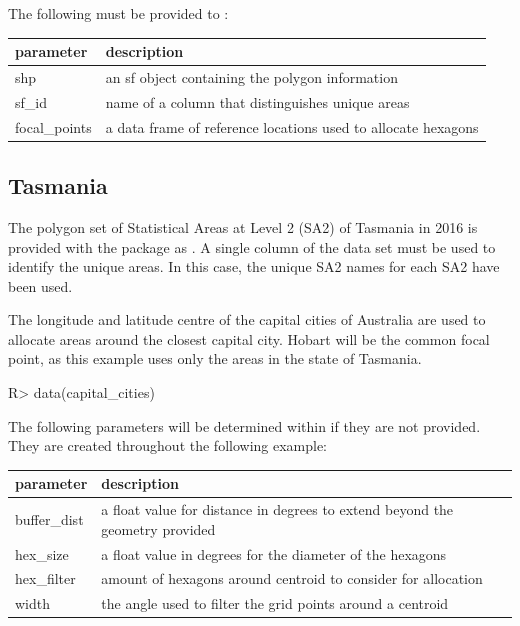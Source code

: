 \documentclass[
]{jss}
\begin{document}
The following must be provided to :

\begin{CodeChunk}

\begin{tabular}{l|l}
\hline
parameter & description\\
\hline
shp & an sf object containing the polygon information\\
\hline
sf\_id & name of a column that distinguishes unique areas\\
\hline
focal\_points & a data frame of reference locations used to allocate hexagons\\
\hline
\end{tabular}

\end{CodeChunk}

\hypertarget{tasmania}{%
\subsection{Tasmania}\label{tasmania}}

The polygon set of Statistical Areas at Level 2 (SA2) \citep{abs2016} of
Tasmania in 2016 is provided with the  package as
. A single column of the data set must be used to identify
the unique areas. In this case, the unique SA2 names for each SA2 have
been used.

The longitude and latitude centre of the capital cities of Australia are
used to allocate areas around the closest capital city. Hobart will be
the common focal point, as this example uses only the areas in the state
of Tasmania.

\begin{CodeChunk}

\begin{CodeInput}
R> data(capital_cities)
\end{CodeInput}
\end{CodeChunk}

The following parameters will be determined within 
if they are not provided. They are created throughout the following
example:

\begin{CodeChunk}

\begin{tabular}{l|l}
\hline
parameter & description\\
\hline
buffer\_dist & a float value for distance in degrees to extend beyond the geometry provided\\
\hline
hex\_size & a float value in degrees for the diameter of the hexagons\\
\hline
hex\_filter & amount of hexagons around centroid to consider for allocation\\
\hline
width & the angle used to filter the grid points around a centroid\\
\hline
\end{tabular}

\end{CodeChunk}
\end{document}
